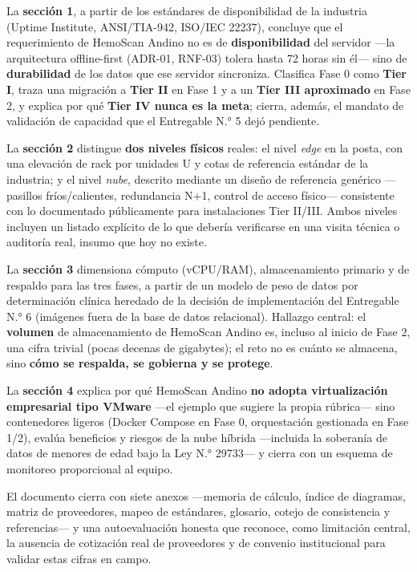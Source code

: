\documentclass[11pt,a4paper]{article}
\begin{document}
La \textbf{sección 1}, a partir de los estándares de disponibilidad de la industria (Uptime Institute, ANSI/TIA-942, ISO/IEC 22237), concluye que el requerimiento de HemoScan Andino no es de \textbf{disponibilidad} del servidor ---la arquitectura offline-first (ADR-01, RNF-03) tolera hasta 72 horas sin él--- sino de \textbf{durabilidad} de los datos que ese servidor sincroniza. Clasifica Fase 0 como \textbf{Tier I}, traza una migración a \textbf{Tier II} en Fase 1 y a un \textbf{Tier III aproximado} en Fase 2, y explica por qué \textbf{Tier IV nunca es la meta}; cierra, además, el mandato de validación de capacidad que el Entregable N.° 5 dejó pendiente.

La \textbf{sección 2} distingue \textbf{dos niveles físicos} reales: el nivel \emph{edge} en la posta, con una elevación de rack por unidades U y cotas de referencia estándar de la industria; y el nivel \emph{nube}, descrito mediante un diseño de referencia genérico ---pasillos fríos/calientes, redundancia N+1, control de acceso físico--- consistente con lo documentado públicamente para instalaciones Tier II/III. Ambos niveles incluyen un listado explícito de lo que debería verificarse en una visita técnica o auditoría real, insumo que hoy no existe.

La \textbf{sección 3} dimensiona cómputo (vCPU/RAM), almacenamiento primario y de respaldo para las tres fases, a partir de un modelo de peso de datos por determinación clínica heredado de la decisión de implementación del Entregable N.° 6 (imágenes fuera de la base de datos relacional). Hallazgo central: el \textbf{volumen} de almacenamiento de HemoScan Andino es, incluso al inicio de Fase 2, una cifra trivial (pocas decenas de gigabytes); el reto no es cuánto se almacena, sino \textbf{cómo se respalda, se gobierna y se protege}.

La \textbf{sección 4} explica por qué HemoScan Andino \textbf{no adopta virtualización empresarial tipo VMware} ---el ejemplo que sugiere la propia rúbrica--- sino contenedores ligeros (Docker Compose en Fase 0, orquestación gestionada en Fase 1/2), evalúa beneficios y riesgos de la nube híbrida ---incluida la soberanía de datos de menores de edad bajo la Ley N.° 29733--- y cierra con un esquema de monitoreo proporcional al equipo.

El documento cierra con siete anexos ---memoria de cálculo, índice de diagramas, matriz de proveedores, mapeo de estándares, glosario, cotejo de consistencia y referencias--- y una autoevaluación honesta que reconoce, como limitación central, la ausencia de cotización real de proveedores y de convenio institucional para validar estas cifras en campo.
\end{document}

